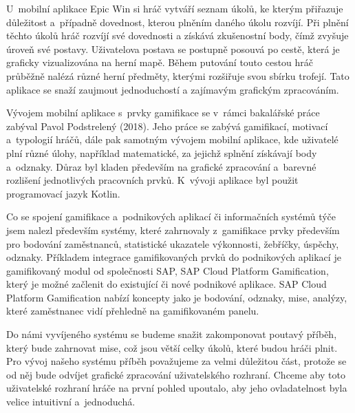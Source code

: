 \documentclass[12pt]{article}
\begin{document}
\par

U~mobilní aplikace Epic Win si hráč vytváří seznam úkolů,
ke kterým přiřazuje důležitost a~případně dovednost,
kterou plněním daného úkolu rozvíjí. 
Při plnění těchto úkolů hráč rozvíjí své dovednosti a získává zkušenostní body,
čímž zvyšuje úroveň své postavy.
Uživatelova postava se postupně posouvá po cestě,
která je graficky vizualizována na herní mapě.
Během putování touto cestou hráč průběžně nalézá
různé herní předměty, kterými rozšiřuje svou sbírku trofejí.
Tato aplikace se snaží zaujmout jednoduchostí a zajímavým grafickým zpracováním.

\par

Vývojem mobilní aplikace s~prvky gamifikace se v~rámci bakalářské práce zabýval Pavol Podstrelený (2018). 
Jeho práce se zabývá gamifikací, motivací a~typologií hráčů, dále pak samotným vývojem mobilní aplikace, 
kde uživatelé plní různé úlohy, například matematické, za jejichž splnění získávají body a~odznaky.
Důraz byl kladen především na grafické zpracování a~barevné rozlišení jednotlivých pracovních prvků.
K~vývoji aplikace byl použit programovací jazyk Kotlin.

\par

Co se spojení gamifikace a~podnikových aplikací či informačních systémů týče jsem nalezl především systémy,
které zahrnovaly z~gamifikace prvky především pro bodování zaměstnanců, statistické ukazatele výkonnosti, žebříčky, úspěchy, odznaky.
Příkladem integrace gamifikovaných prvků do podnikových aplikací je gamifikovaný modul od společnosti SAP, SAP Cloud Platform Gamification,
který je možné začlenit do existující či nové podnikové aplikace. 
SAP Cloud Platform Gamification nabízí koncepty jako je bodování,
odznaky, mise, analýzy, které zaměstnanec vidí přehledně na gamifikovaném panelu.

\par
Do námi vyvíjeného systému se budeme snažit zakomponovat poutavý příběh,
který bude zahrnovat mise, což jsou větší celky úkolů, které budou hráči plnit.
Pro vývoj našeho systému příběh považujeme za velmi důležitou část,
protože se od něj bude odvíjet grafické zpracování uživatelského rozhraní. 
Chceme aby toto uživatelské rozhraní hráče na první pohled upoutalo,
aby jeho ovladatelnost byla velice intuitivní a~jednoduchá.
\end{document}
